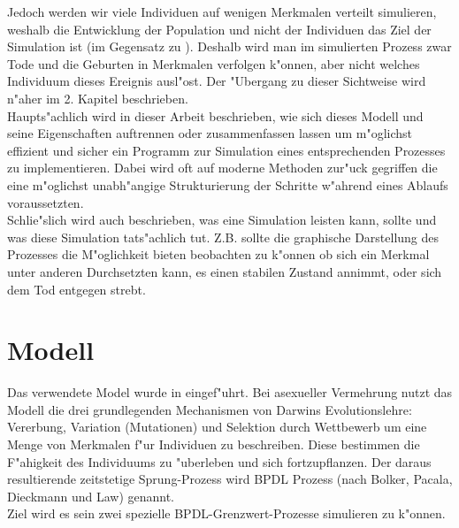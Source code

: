 \documentclass[11pt, a4paper, german]{article}
\theoremstyle{plain}
\begin{document}
Jedoch werden wir viele Individuen auf wenigen Merkmalen verteilt simulieren, weshalb die Entwicklung der Population und nicht der Individuen das Ziel der Simulation ist (im Gegensatz zu \cite{fournier2004microscopic}). Deshalb wird man im simulierten Prozess zwar Tode und die Geburten in Merkmalen verfolgen k"onnen, aber nicht welches Individuum dieses Ereignis ausl"ost. Der "Ubergang zu dieser Sichtweise wird n"aher im 2. Kapitel beschrieben.\\
Haupts"achlich wird in dieser Arbeit beschrieben, wie sich dieses Modell und seine Eigenschaften auftrennen oder zusammenfassen lassen um m"oglichst effizient und sicher ein Programm zur Simulation eines entsprechenden Prozesses zu implementieren. Dabei wird oft auf moderne Methoden zur"uck gegriffen die eine m"oglichst unabh"angige Strukturierung der Schritte w"ahrend eines Ablaufs voraussetzten.\\
Schlie"slich wird auch beschrieben, was eine Simulation leisten kann, sollte und was diese Simulation tats"achlich tut. Z.B. sollte die graphische Darstellung des Prozesses die M"oglichkeit bieten beobachten zu k"onnen ob sich ein Merkmal unter anderen Durchsetzten kann, es einen stabilen Zustand annimmt, oder sich dem Tod entgegen strebt.


\clearpage
\section{Modell}
Das verwendete Model wurde in \cite{Bolker_Spatial_moment,Bolker1997179,raey_Dieckmann_Law} eingef"uhrt. Bei asexueller Vermehrung nutzt das Modell die drei grundlegenden Mechanismen von Darwins Evolutionslehre: Vererbung, Variation (Mutationen) und Selektion durch Wettbewerb um eine Menge von Merkmalen f"ur Individuen zu beschreiben. Diese bestimmen die F"ahigkeit des Individuums zu "uberleben und sich fortzupflanzen. Der daraus resultierende zeitstetige Sprung-Prozess wird BPDL Prozess (nach Bolker, Pacala, Dieckmann und Law) genannt.\\
Ziel wird es sein  zwei spezielle BPDL-Grenzwert-Prozesse simulieren zu k"onnen.
\end{document}
